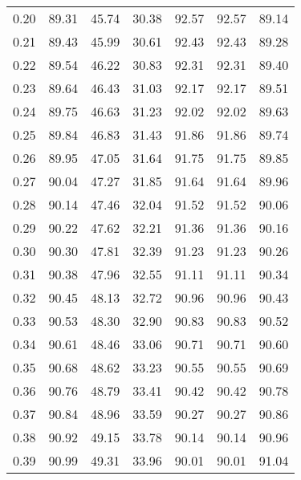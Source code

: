 \begin{tabular}{|c|c|c|c|c|c|c|}
      0.20 &     89.31 &     45.74 &      30.38 &   92.57 &      92.57 &         89.14 \\
      0.21 &     89.43 &     45.99 &      30.61 &   92.43 &      92.43 &         89.28 \\
      0.22 &     89.54 &     46.22 &      30.83 &   92.31 &      92.31 &         89.40 \\
      0.23 &     89.64 &     46.43 &      31.03 &   92.17 &      92.17 &         89.51 \\
      0.24 &     89.75 &     46.63 &      31.23 &   92.02 &      92.02 &         89.63 \\
      0.25 &     89.84 &     46.83 &      31.43 &   91.86 &      91.86 &         89.74 \\
      0.26 &     89.95 &     47.05 &      31.64 &   91.75 &      91.75 &         89.85 \\
      0.27 &     90.04 &     47.27 &      31.85 &   91.64 &      91.64 &         89.96 \\
      0.28 &     90.14 &     47.46 &      32.04 &   91.52 &      91.52 &         90.06 \\
      0.29 &     90.22 &     47.62 &      32.21 &   91.36 &      91.36 &         90.16 \\
      0.30 &     90.30 &     47.81 &      32.39 &   91.23 &      91.23 &         90.26 \\
      0.31 &     90.38 &     47.96 &      32.55 &   91.11 &      91.11 &         90.34 \\
      0.32 &     90.45 &     48.13 &      32.72 &   90.96 &      90.96 &         90.43 \\
      0.33 &     90.53 &     48.30 &      32.90 &   90.83 &      90.83 &         90.52 \\
      0.34 &     90.61 &     48.46 &      33.06 &   90.71 &      90.71 &         90.60 \\
      0.35 &     90.68 &     48.62 &      33.23 &   90.55 &      90.55 &         90.69 \\
      0.36 &     90.76 &     48.79 &      33.41 &   90.42 &      90.42 &         90.78 \\
      0.37 &     90.84 &     48.96 &      33.59 &   90.27 &      90.27 &         90.86 \\
      0.38 &     90.92 &     49.15 &      33.78 &   90.14 &      90.14 &         90.96 \\
      0.39 &     90.99 &     49.31 &      33.96 &   90.01 &      90.01 &         91.04 \\

\end{tabular}
